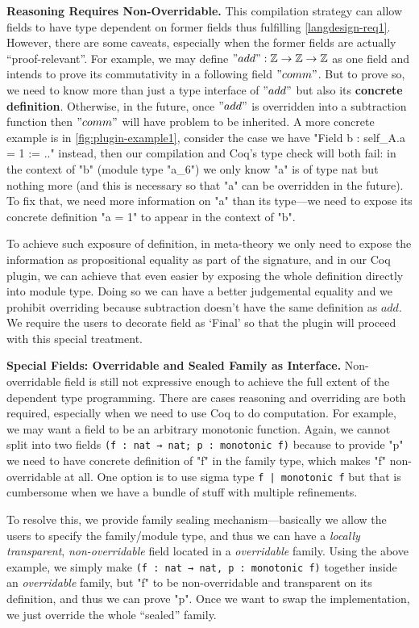 \textbf{Reasoning Requires Non-Overridable.} This compilation strategy can allow fields to have type dependent on former fields thus fulfilling \ref{langdesign-req1}. However, there are some caveats, especially when the former fields are actually ``proof-relevant''. For example, we may define $"add" : \mathbb{Z} \to \mathbb{Z} \to \mathbb{Z}$ as one field and intends to prove its commutativity in a following field $"comm"$. But to prove so, we need to know more than just a type interface of $"add"$ but also its \textbf{concrete definition}. Otherwise, in the future, once $"add"$ is overridden into a subtraction function then $"comm"$ will have problem to be  inherited. A more concrete example is in \cref{fig:plugin-example1}, consider the case we have "Field b : self_A.a = 1 := .." instead, then our compilation and Coq's type check will both fail: in the context of "b" (module type "a_6") we only know "a" is of type nat but nothing more (and this is necessary so that "a" can be overridden in the future). To fix that, we need more information on "a" than its type---we need to expose its concrete definition "a = 1" to appear in the context of "b".

To achieve such exposure of definition, in meta-theory we only need to expose the information as propositional equality as part of the signature, and in our Coq plugin, we can achieve that even easier by exposing the whole definition directly into module type. Doing so we can have a better judgemental equality and we prohibit overriding because subtraction doesn't have the same definition as $add$. We require the users to decorate field as `Final' so that the plugin will proceed with this special treatment.

\textbf{Special Fields: Overridable and Sealed Family as Interface.} 
Non-overridable field is still not expressive enough to achieve the full extent of the dependent type programming. There are cases reasoning and overriding are both required, especially when we need to use Coq to do computation. For example, we may want a field to be an arbitrary monotonic function. Again, we cannot split into two fields \texttt{(f : nat → nat; p : monotonic f)} because to provide "p" we need to have concrete definition of "f" in the family type, which makes "f" non-overridable at all. One option is to use sigma type \texttt{{f | monotonic f}} but that is cumbersome when we have a bundle of stuff with multiple refinements. 

To resolve this, we provide family sealing mechanism---basically we allow the users to specify the family/module type, and thus we can have a \textit{locally transparent}, \textit{non-overridable} field located in a \textit{overridable} family. Using the above example, we simply make \texttt{(f : nat → nat, p : monotonic f)} together inside an \textit{overridable} family, but "f" to be non-overridable and transparent on its definition, and thus we can prove "p". Once we want to swap the implementation, we just override the whole ``sealed'' family. 

